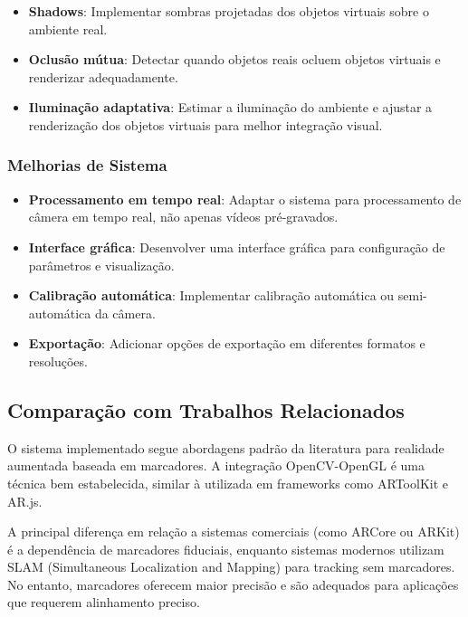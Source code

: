 \begin{itemize}
    \item \textbf{Shadows}: Implementar sombras projetadas dos objetos virtuais sobre o ambiente real.
    
    \item \textbf{Oclusão mútua}: Detectar quando objetos reais ocluem objetos virtuais e renderizar adequadamente.
    
    \item \textbf{Iluminação adaptativa}: Estimar a iluminação do ambiente e ajustar a renderização dos objetos virtuais para melhor integração visual.
\end{itemize}

\subsubsection{Melhorias de Sistema}

\begin{itemize}
    \item \textbf{Processamento em tempo real}: Adaptar o sistema para processamento de câmera em tempo real, não apenas vídeos pré-gravados.
    
    \item \textbf{Interface gráfica}: Desenvolver uma interface gráfica para configuração de parâmetros e visualização.
    
    \item \textbf{Calibração automática}: Implementar calibração automática ou semi-automática da câmera.
    
    \item \textbf{Exportação}: Adicionar opções de exportação em diferentes formatos e resoluções.
\end{itemize}

\subsection{Comparação com Trabalhos Relacionados}

O sistema implementado segue abordagens padrão da literatura para realidade aumentada baseada em marcadores. A integração OpenCV-OpenGL é uma técnica bem estabelecida, similar à utilizada em frameworks como ARToolKit e AR.js.

A principal diferença em relação a sistemas comerciais (como ARCore ou ARKit) é a dependência de marcadores fiduciais, enquanto sistemas modernos utilizam SLAM (Simultaneous Localization and Mapping) para tracking sem marcadores. No entanto, marcadores oferecem maior precisão e são adequados para aplicações que requerem alinhamento preciso.

